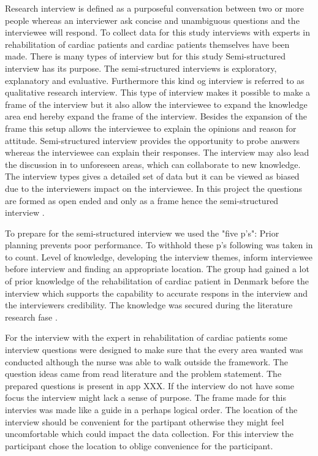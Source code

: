 Research interview is defined as a purposeful conversation between two or more people whereas an interviewer ask concise and unambiguous questions and the interviewee will respond. To collect data for this study interviews with experts in rehabilitation of  cardiac patients and cardiac patients themselves have been made. 
There is many types of interview but for this study Semi-structured interview has its purpose. The semi-structured interviews is exploratory, explanatory and evaluative. Furthermore this kind og interview is referred to as qualitative research interview.
This type of interview makes it possible to make a frame of the interview but it also allow the interviewee to expand the knowledge area end hereby expand the frame of the interview. Besides the expansion of the frame this setup allows the interviewee to explain the opinions and reason for attitude. Semi-structured interview provides the opportunity to probe answers whereas the interviewee can explain their responses. The interview may also lead the discussion in to unforeseen areas, which can collaborate to new knowledge. The interview types gives a detailed set of data but it can be viewed as biased due to the interviewers impact on the interviewee. 
In this project the questions are formed as open ended and only as a frame hence the semi-structured interview \cite{mark2009research}.

To prepare for the semi-structured interview we used the "five p's": Prior planning prevents poor performance. To withhold these p's following was taken in to count. Level of knowledge, developing the interview themes, inform interviewee before interview and finding an appropriate location. 
The group had gained a lot of prior knowledge of the rehabilitation of cardiac patient in Denmark before the interview which supports the capability to accurate respons in the interview and the interviewers credibility. The knowledge was secured during the literature research fase \cite{mark2009research}. 

For the interview with the expert in rehabilitation of cardiac patients some interview questions were designed to make sure that the every area wanted was conducted although the nurse was able to walk outside the framework. The question ideas came from read literature and the problem statement. The prepared questions is present in app XXX. If the interview do not have some focus the interview might lack a sense of purpose. The frame made for this intervies was made like a guide in a perhaps logical order. The location of the interview should be convenient for the partipant otherwise they might feel uncomfortable which could impact the data collection. For this interview the participant chose the location to oblige convenience for the participant. 

